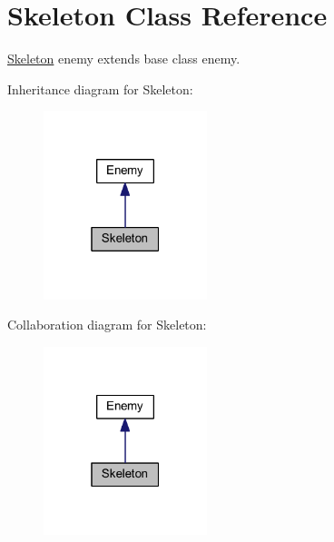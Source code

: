 \hypertarget{class_skeleton}{}\section{Skeleton Class Reference}
\label{class_skeleton}


\mbox{\hyperlink{class_skeleton}{Skeleton}} enemy extends base class enemy.  




Inheritance diagram for Skeleton\+:\nopagebreak
\begin{figure}[H]
\begin{center}
\leavevmode
\includegraphics[width=135pt]{class_skeleton__inherit__graph}
\end{center}
\end{figure}


Collaboration diagram for Skeleton\+:\nopagebreak
\begin{figure}[H]
\begin{center}
\leavevmode
\includegraphics[width=135pt]{class_skeleton__coll__graph}
\end{center}
\end{figure}
